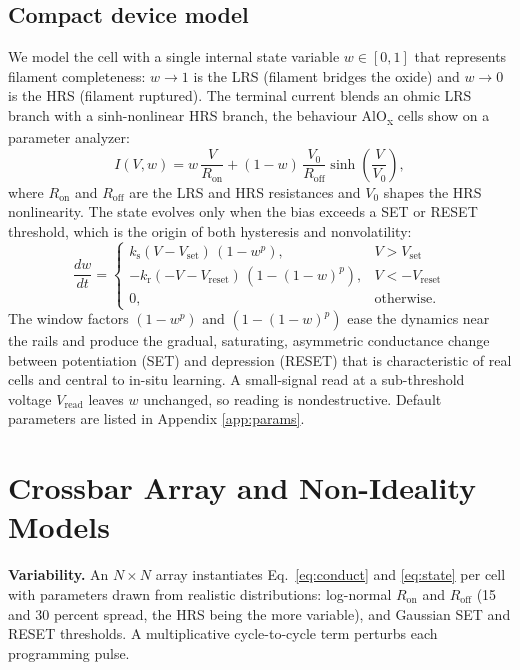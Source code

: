 \documentclass[conference]{IEEEtran}
\begin{document}
\subsection{Compact device model}
We model the cell with a single internal state variable $w \in [0,1]$ that
represents filament completeness: $w \to 1$ is the LRS (filament bridges the
oxide) and $w \to 0$ is the HRS (filament ruptured). The terminal current blends
an ohmic LRS branch with a sinh-nonlinear HRS branch, the behaviour AlO\textsubscript{x}
cells show on a parameter analyzer:
\begin{equation}
I(V,w) = w\,\frac{V}{R_\mathrm{on}} + (1-w)\,\frac{V_0}{R_\mathrm{off}}\sinh\!\left(\frac{V}{V_0}\right),
\label{eq:conduct}
\end{equation}
where $R_\mathrm{on}$ and $R_\mathrm{off}$ are the LRS and HRS resistances and
$V_0$ shapes the HRS nonlinearity. The state evolves only when the bias exceeds
a SET or RESET threshold, which is the origin of both hysteresis and
nonvolatility:
\begin{equation}
\frac{dw}{dt} =
\begin{cases}
k_\mathrm{s}(V-V_\mathrm{set})\,(1-w^{p}), & V > V_\mathrm{set}\\[2pt]
-k_\mathrm{r}(-V-V_\mathrm{reset})\,(1-(1-w)^{p}), & V < -V_\mathrm{reset}\\[2pt]
0, & \text{otherwise.}
\end{cases}
\label{eq:state}
\end{equation}
The window factors $(1-w^{p})$ and $(1-(1-w)^{p})$ ease the dynamics near the
rails and produce the gradual, saturating, asymmetric conductance change between
potentiation (SET) and depression (RESET) that is characteristic of real cells
and central to in-situ learning. A small-signal read at a sub-threshold voltage
$V_\mathrm{read}$ leaves $w$ unchanged, so reading is nondestructive. Default
parameters are listed in Appendix \ref{app:params}.

\section{Crossbar Array and Non-Ideality Models}
\label{sec:array}
\textbf{Variability.} An $N\times N$ array instantiates Eq.~\ref{eq:conduct} and
\ref{eq:state} per cell with parameters drawn from realistic distributions:
log-normal $R_\mathrm{on}$ and $R_\mathrm{off}$ (15 and 30 percent spread, the
HRS being the more variable), and Gaussian SET and RESET thresholds. A
multiplicative cycle-to-cycle term perturbs each programming pulse.
\end{document}
